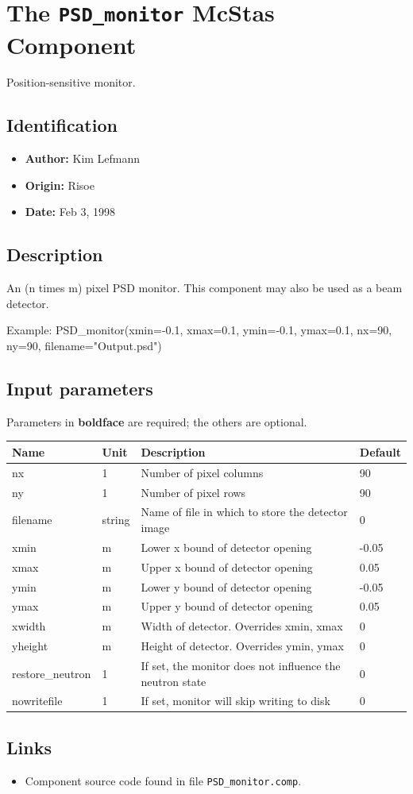 \section{The \texttt{PSD\_monitor} McStas Component}
Position-sensitive monitor.

\subsection*{Identification}
\begin{itemize}
  \item \textbf{Author:} Kim Lefmann
  \item \textbf{Origin:} Risoe
  \item \textbf{Date:} Feb 3, 1998
\end{itemize}

\subsection*{Description}
An (n times m) pixel PSD monitor. This component may also be used as a beam detector.

Example: PSD\_monitor(xmin=-0.1, xmax=0.1, ymin=-0.1, ymax=0.1, nx=90, ny=90, filename="Output.psd")

\subsection*{Input parameters}
Parameters in \textbf{boldface} are required; the others are optional.

\begin{longtable}{p{}p{}p{}p{}}
\toprule
\textbf{Name} & \textbf{Unit} & \textbf{Description} & \textbf{Default} \\
\midrule
\endhead
nx & 1 & Number of pixel columns & 90 \\
ny & 1 & Number of pixel rows & 90 \\
filename & string & Name of file in which to store the detector image & 0 \\
xmin & m & Lower x bound of detector opening & -0.05 \\
xmax & m & Upper x bound of detector opening & 0.05 \\
ymin & m & Lower y bound of detector opening & -0.05 \\
ymax & m & Upper y bound of detector opening & 0.05 \\
xwidth & m & Width of detector. Overrides xmin, xmax & 0 \\
yheight & m & Height of detector. Overrides ymin, ymax & 0 \\
restore\_neutron & 1 & If set, the monitor does not influence the neutron state & 0 \\
nowritefile & 1 & If set, monitor will skip writing to disk & 0 \\
\bottomrule
\end{longtable}

\subsection*{Links}
\begin{itemize}
  \item Component source code found in file \texttt{PSD\_monitor.comp}.
\end{itemize}
